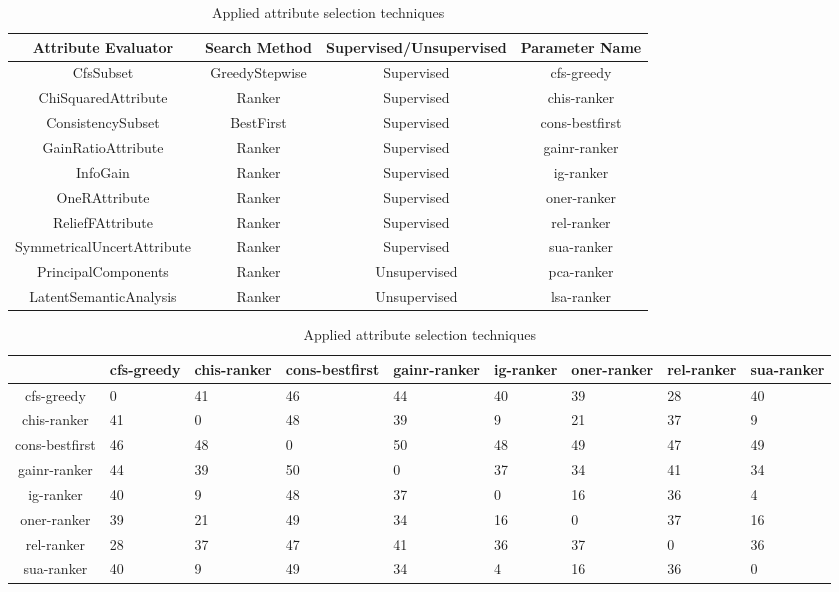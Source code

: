 \begin{table}[p]
\begin{center}
\begin{tabular}{|c|c|c|c|}
\hline Attribute Evaluator & Search Method & Supervised/Unsupervised & Parameter Name \\
\hline CfsSubset & GreedyStepwise & Supervised & cfs-greedy\\
\hline ChiSquaredAttribute & Ranker & Supervised & chis-ranker\\
\hline ConsistencySubset & BestFirst & Supervised & cons-bestfirst\\
\hline GainRatioAttribute & Ranker & Supervised & gainr-ranker\\
\hline InfoGain & Ranker & Supervised & ig-ranker\\
\hline OneRAttribute & Ranker & Supervised & oner-ranker\\
\hline ReliefFAttribute & Ranker & Supervised & rel-ranker\\
\hline SymmetricalUncertAttribute & Ranker & Supervised & sua-ranker\\
\hline PrincipalComponents & Ranker & Unsupervised & pca-ranker\\
\hline LatentSemanticAnalysis & Ranker & Unsupervised & lsa-ranker\\
\hline
\end{tabular}
\caption{Applied attribute selection techniques}
\label{table:techniques}
\end{center}
\end{table}


\begin{table}[p]
\begin{center}
\begin{tabular}{|c|p{1.3cm}|p{1.3cm}|p{1.3cm}|p{1.3cm}|p{1.3cm}|p{1.3cm}|p{1.3cm}|p{1.3cm}|}
\hline & cfs-greedy & chis-ranker & cons-bestfirst & gainr-ranker & ig-ranker & oner-ranker & rel-ranker & sua-ranker\\
\hline cfs-greedy & 0 & 41 & 46 & 44 & 40 & 39 & 28 & 40\\
\hline chis-ranker & 41 & 0 & 48 & 39 & 9 & 21 & 37 & 9\\
\hline cons-bestfirst & 46 & 48 & 0 & 50 & 48 & 49 & 47 & 49\\
\hline gainr-ranker & 44 & 39 & 50 & 0 & 37 & 34 & 41 & 34\\
\hline ig-ranker & 40 & 9 & 48 & 37 & 0 & 16 & 36 & 4\\
\hline oner-ranker & 39 & 21 & 49 & 34 & 16 & 0 & 37 & 16\\
\hline rel-ranker & 28 & 37 & 47 & 41 & 36 & 37 & 0 & 36\\
\hline sua-ranker & 40 & 9 & 49 & 34 & 4 & 16 & 36 & 0\\
\hline
\end{tabular}
\caption{Applied attribute selection techniques}
\label{table:distancematrix}
\end{center}
\end{table}


